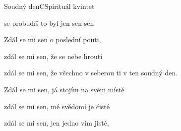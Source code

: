 \begin{song}{Soudný den}{C}{Spirituál kvintet}
\begin{SBChorus*}
 se probudíš to byl jen sen   sen

\end{SBChorus*}

\begin{SBVerse}

Zdál se mi sen o poslední pouti,

zdál se mi sen, že se nebe hroutí

zdál se mi sen, že všechno v seberou ti v ten soudný den.

\end{SBVerse}

\begin{SBVerse}

Zdál se mi sen, já stojím na svém místě

zdál se mi sen, mé svědomí je čisté

zdál se mi sen, jen jedno vím jistě,   

\end{SBVerse}

\end{song}

\clearpage
